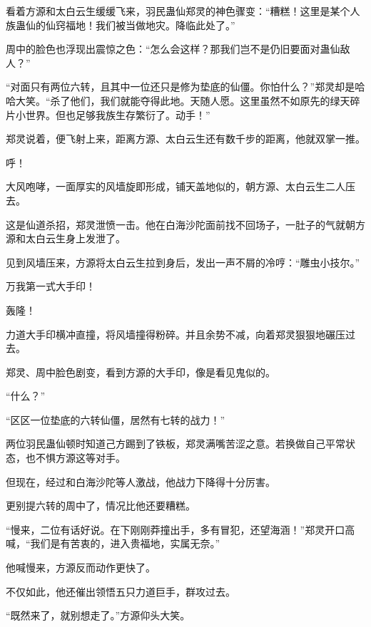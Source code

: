 \begin{this_body}
看着方源和太白云生缓缓飞来，羽民蛊仙郑灵的神色骤变：“糟糕！这里是某个人族蛊仙的仙窍福地！我们被当做地灾。降临此处了。”

周中的脸色也浮现出震惊之色：“怎么会这样？那我们岂不是仍旧要面对蛊仙敌人？”

“对面只有两位六转，且其中一位还只是修为垫底的仙僵。你怕什么？”郑灵却是哈哈大笑。“杀了他们，我们就能夺得此地。天随人愿。这里虽然不如原先的绿天碎片小世界。但也足够我族生存繁衍了。动手！”

郑灵说着，便飞射上来，距离方源、太白云生还有数千步的距离，他就双掌一推。

呼！

大风咆哮，一面厚实的风墙旋即形成，铺天盖地似的，朝方源、太白云生二人压去。

这是仙道杀招，郑灵泄愤一击。他在白海沙陀面前找不回场子，一肚子的气就朝方源和太白云生身上发泄了。

见到风墙压来，方源将太白云生拉到身后，发出一声不屑的冷哼：“雕虫小技尔。”

万我第一式大手印！

轰隆！

力道大手印横冲直撞，将风墙撞得粉碎。并且余势不减，向着郑灵狠狠地碾压过去。

郑灵、周中脸色剧变，看到方源的大手印，像是看见鬼似的。

“什么？”

“区区一位垫底的六转仙僵，居然有七转的战力！”

两位羽民蛊仙顿时知道己方踢到了铁板，郑灵满嘴苦涩之意。若换做自己平常状态，也不惧方源这等对手。

但现在，经过和白海沙陀等人激战，他战力下降得十分厉害。

更别提六转的周中了，情况比他还要糟糕。

“慢来，二位有话好说。在下刚刚莽撞出手，多有冒犯，还望海涵！”郑灵开口高喊，“我们是有苦衷的，进入贵福地，实属无奈。”

他喊慢来，方源反而动作更快了。

不仅如此，他还催出领悟五只力道巨手，群攻过去。

“既然来了，就别想走了。”方源仰头大笑。

\end{this_body}

